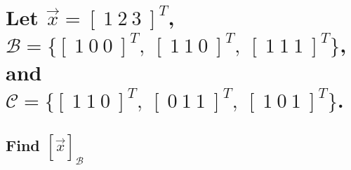 \documentclass[../main.tex]{subfiles}
\begin{document}
\section{Let $\vec{x} = [\ 1 \ 2 \ 3\ ]^T$, $\mathcal{B} = \{[\ 1 \ 0 \ 0\ ]^T, \  [\ 1 \ 1 \ 0\ ]^T, \ [\ 1 \ 1 \ 1\ ]^T \}$, and $\mathcal{C} = \{[\ 1 \ 1 \ 0\ ]^T, \  [\ 0 \ 1 \ 1\ ]^T, \ [\ 1 \ 0 \ 1\ ]^T \}$.}
\subsection{Find $[\vec{x}]_{\mathcal{B}}$}
\end{document}
